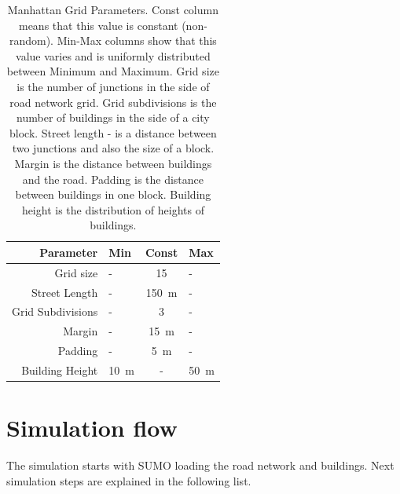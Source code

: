 \documentclass[]{nsm-thesis}
\begin{document}
\begin{table}
    \centering
    \begin{tabular}{rlcl}
        \toprule
        Parameter & Min & Const & Max \\
        \midrule
        	Grid size & - & 15 & - \\
        	Street Length & - & \SI{150}{\meter} & - \\
		Grid Subdivisions & - & 3 & - \\
		Margin & - & \SI{15}{\meter} & - \\
		Padding & - & \SI{5}{\meter} & - \\
		Building Height & \SI{10}{\meter} & - & \SI{50}{\meter} \\
        \bottomrule
    \end{tabular}
    \caption{Manhattan Grid Parameters. Const column means that this value is constant (non-random). Min-Max columns show that this value varies and is uniformly distributed between Minimum and Maximum. Grid size is the number of junctions in the side of road network grid. Grid subdivisions is the number of buildings in the side of a city block. Street length - is a distance between two junctions and also the size of a block. Margin is the distance between buildings and the road. Padding is the distance between buildings in one block. Building height is the distribution of heights of buildings. }
    \label{tab:manhattangrid}
\end{table}


\section {Simulation flow}

The simulation starts with SUMO loading the road network and buildings. Next simulation steps are explained in the following list.
\end{document}
